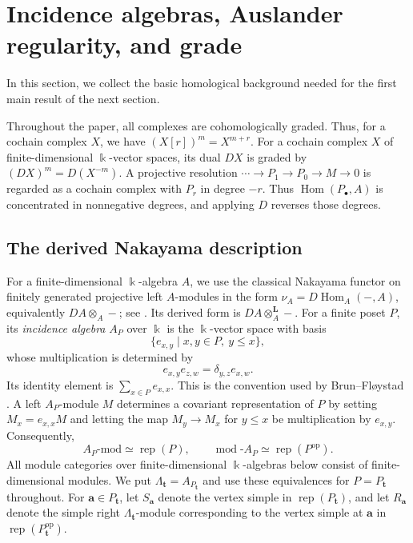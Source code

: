 \documentclass[10pt,a4paper]{amsart}
\newcommand{\Rep}{\operatorname{rep}}
\newcommand{\Hom}{\operatorname{Hom}}
\newcommand{\modcat}{\operatorname{mod}}
\begin{document}
\section{Incidence algebras, Auslander regularity, and grade}\label{sec:homological}
In this section, we collect the basic homological background needed for the first main result of the next section.

Throughout the paper, all complexes are cohomologically graded.  Thus, for a cochain complex $X$, we have $(X[r])^m=X^{m+r}$.  For a cochain complex $X$ of finite-dimensional $\Bbbk$-vector spaces, its dual $DX$ is graded by $(DX)^m=D(X^{-m})$.  A projective resolution $\cdots\to P_1\to P_0\to M\to0$ is regarded as a cochain complex with $P_r$ in degree $-r$.  Thus $\Hom(P_\bullet,A)$ is concentrated in nonnegative degrees, and applying $D$ reverses those degrees.

\subsection{The derived Nakayama description}

For a finite-dimensional $\Bbbk$-algebra $A$, we use the classical Nakayama
functor on finitely generated projective left $A$-modules in the form
$\nu_A=D\Hom_A(-,A)$, equivalently $DA\otimes_A-$; see \cite{ARS}.  Its
derived form is $DA\otimes_A^{\mathbf L}-$.  For a finite poset $P$, its
\emph{incidence algebra} $A_P$ over $\Bbbk$
is the $\Bbbk$-vector space with basis
\[
\{e_{x,y}\mid x,y\in P,\ y\le x\},
\]
whose multiplication is determined by
\[
e_{x,y}e_{z,w}=\delta_{y,z}e_{x,w}.
\]
Its identity element is $\sum_{x\in P}e_{x,x}$.  This is the convention
used by Brun--Fl\o ystad \cite{BF}.  A left $A_P$-module $M$ determines a
covariant representation of $P$ by setting $M_x=e_{x,x}M$ and letting the
map $M_y\to M_x$ for $y\le x$ be multiplication by $e_{x,y}$.
Consequently,
\[
A_P\text{-mod}\simeq\Rep(P),
\qquad
\modcat\text{-}A_P\simeq\Rep(P^{\mathrm{op}}).
\]
All module categories over finite-dimensional $\Bbbk$-algebras below
consist of finite-dimensional modules. We put
$\Lambda_{\mathbf t}=A_{P_{\mathbf t}}$ and use these equivalences for
$P=P_{\mathbf t}$ throughout.  For
$\mathbf a\in P_{\mathbf t}$, let $S_{\mathbf a}$ denote the vertex simple in
$\Rep(P_{\mathbf t})$, and let $R_{\mathbf a}$ denote the simple right
$\Lambda_{\mathbf t}$-module corresponding to the vertex simple at
$\mathbf a$ in $\Rep(P_{\mathbf t}^{\mathrm{op}})$.
\end{document}
